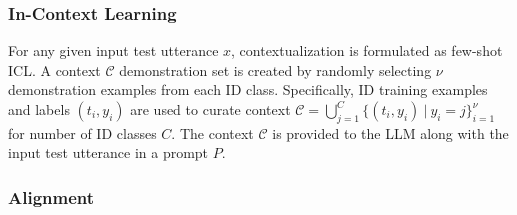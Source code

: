 \subsubsection{In-Context Learning}
For any given input test utterance $x$, contextualization is formulated as few-shot ICL.
A context $\mathcal{C}$ demonstration set is created by randomly selecting $\nu$ demonstration examples from each ID class. Specifically, ID training examples and labels $(t_i,y_i)$ are used to curate context $\mathcal{C} = \bigcup_{j=1}^{C} \{(t_i,y_i)\ |\ y_i = j\}_{i=1}^{\nu}$ for number of ID classes $C$. The context $\mathcal{C}$ is provided to the LLM along with the input test utterance in a prompt $P$.


\subsubsection{Alignment} 

